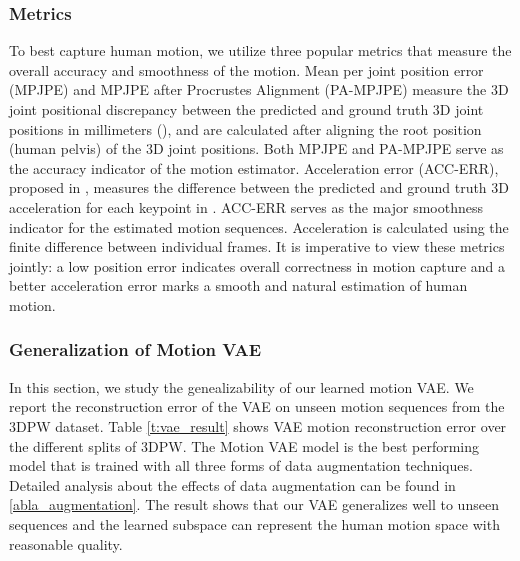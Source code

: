 \documentclass[runningheads]{llncs}
\begin{document}
\subsubsection{Metrics}
To best capture human motion, we utilize three popular metrics that measure the overall accuracy and smoothness of the motion. Mean per joint position error (MPJPE) and MPJPE after Procrustes Alignment (PA-MPJPE) measure the 3D joint positional discrepancy between the predicted and ground truth 3D joint positions in millimeters (), and are calculated after aligning the root position (human pelvis) of the 3D joint positions. Both MPJPE and PA-MPJPE serve as the accuracy indicator of the motion estimator. Acceleration error (ACC-ERR), proposed in \cite{hmmr}, measures the difference between the predicted and ground truth 3D acceleration for each keypoint in . ACC-ERR serves as the major smoothness indicator for the estimated motion sequences. Acceleration is calculated using the finite difference between individual frames. It is imperative to view these metrics jointly: a low position error indicates overall correctness in motion capture and a better acceleration error marks a smooth and natural estimation of human motion. 


\subsubsection{Generalization of Motion VAE}

In this section, we study the genealizability of our learned motion VAE. We report the reconstruction error of the VAE on unseen motion sequences from the 3DPW dataset. Table \ref{t:vae_result} shows VAE motion reconstruction error over the different splits of 3DPW. The Motion VAE model is the best performing model that is trained with all three forms of data augmentation techniques. Detailed analysis about the effects of data augmentation can be found in \ref{abla_augmentation}. The result shows that our VAE generalizes well to unseen sequences and the learned subspace can represent the human motion space with reasonable quality. 
\end{document}
